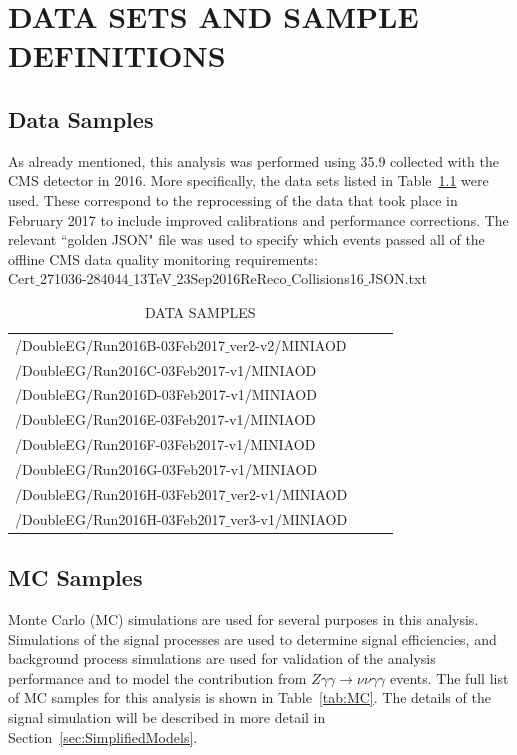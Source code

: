 \chapter{DATA SETS AND SAMPLE DEFINITIONS}
\label{chap:EventSelect}

\section{Data Samples}

As already mentioned, this analysis was performed using 35.9 \fbinv collected with the CMS detector in 2016. More specifically, the data sets listed in Table~\ref{tab:datasets} were used. These correspond to the reprocessing of the data that took place in February 2017 to include improved calibrations and performance corrections. The relevant ``golden JSON" file was used to specify which events passed all of the offline CMS data quality monitoring requirements: \\
Cert$\_$271036-284044$\_$13TeV$\_$23Sep2016ReReco$\_$Collisions16$\_$JSON.txt

\begin{table}[ht]
\caption{DATA SAMPLES}
\label{tab:datasets}
\begin{center}
\begin{tabular}{|>{\centering\arraybackslash}m{0.9\linewidth}|}
\hline
\hline
/DoubleEG/Run2016B-03Feb2017$\_$ver2-v2/MINIAOD \\
/DoubleEG/Run2016C-03Feb2017-v1/MINIAOD \\
/DoubleEG/Run2016D-03Feb2017-v1/MINIAOD \\
/DoubleEG/Run2016E-03Feb2017-v1/MINIAOD \\
/DoubleEG/Run2016F-03Feb2017-v1/MINIAOD \\
/DoubleEG/Run2016G-03Feb2017-v1/MINIAOD \\
/DoubleEG/Run2016H-03Feb2017$\_$ver2-v1/MINIAOD \\
/DoubleEG/Run2016H-03Feb2017$\_$ver3-v1/MINIAOD \\      
\hline
\hline
\end{tabular}
\end{center}
\end{table}

\section{MC Samples}
\label{sec:MC}
Monte Carlo (MC) simulations are used for several purposes in this analysis. Simulations
of the signal processes are used to determine signal efficiencies, and
background process simulations are used for validation of the analysis performance
and to model the contribution from $Z\gamma\gamma\rightarrow\nu\nu\gamma\gamma$
events. The full list of MC samples for this analysis is shown in Table~\ref{tab:MC}.
The details of the signal simulation will be described in more detail in Section~\ref{sec:SimplifiedModels}. 

